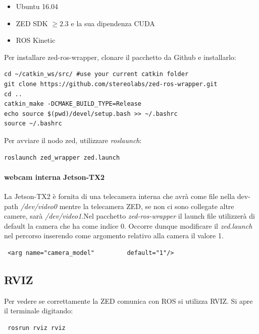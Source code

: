 \documentclass[a4paper]{article}
\begin{document}
\begin{itemize}
\item Ubuntu 16.04
\item ZED SDK $\ge 2.3 $   e la sua dipendenza CUDA
\item ROS Kinetic
\end{itemize}

Per installare zed-ros-wrapper, clonare il pacchetto da Github e installarlo:
\begin{verbatim}
cd ~/catkin_ws/src/ #use your current catkin folder
git clone https://github.com/stereolabs/zed-ros-wrapper.git
cd ..
catkin_make -DCMAKE_BUILD_TYPE=Release
echo source $(pwd)/devel/setup.bash >> ~/.bashrc
source ~/.bashrc
\end{verbatim}

Per avviare il nodo zed, utilizzare \textit{roslaunch}:
\begin{verbatim}
roslaunch zed_wrapper zed.launch
\end{verbatim}

\paragraph{webcam interna Jetson-TX2}
La Jetson-TX2 è fornita di una telecamera interna che avrà come file nella dev-path  \textit{/dev/video0} mentre la telecamera ZED, se non ci sono collegate altre camere, sarà \textit{/dev/video1}.Nel pacchetto \textit{zed-ros-wrapper} il launch file utilizzerà di default la camera che ha come indice 0. Occorre dunque modificare il \textit{zed.launch} nel percorso   inserendo come argomento relativo alla camera il valore 1.
\begin{verbatim}
 <arg name="camera_model"         default="1"/>
\end{verbatim}



\subsection{RVIZ}
Per vedere se correttamente la ZED comunica con ROS si utilizza RVIZ. Si apre il terminale digitando:
\begin{verbatim}
 rosrun rviz rviz
\end{verbatim}
\end{document}

